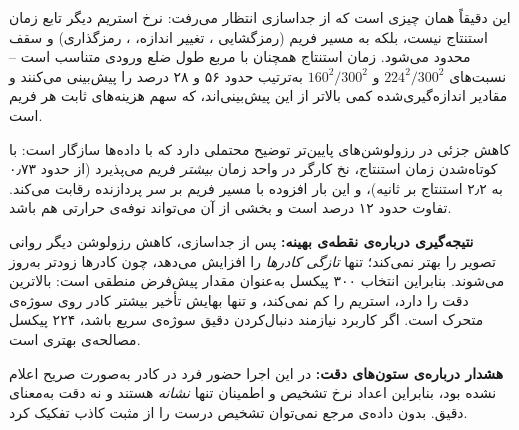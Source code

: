 این دقیقاً همان چیزی است که از جداسازی انتظار می‌رفت: نرخ استریم دیگر تابع زمان استنتاج نیست، بلکه به مسیر فریم (رمزگشایی ، تغییر اندازه، ، رمزگذاری) و سقف  محدود می‌شود. زمان استنتاج همچنان با مربع طول ضلع ورودی متناسب است -- نسبت‌های $224^2/300^2$ و $160^2/300^2$ به‌ترتیب حدود ۵۶ و ۲۸ درصد را پیش‌بینی می‌کنند و مقادیر اندازه‌گیری‌شده کمی بالاتر از این پیش‌بینی‌اند، که سهم هزینه‌های ثابت هر فریم است.

کاهش جزئی  در رزولوشن‌های پایین‌تر توضیح محتملی دارد که با داده‌ها سازگار است: با کوتاه‌شدن زمان استنتاج، نخ کارگر در واحد زمان \emph{بیشتر} فریم می‌پذیرد (از حدود ۰٫۷۳ به ۲٫۲ استنتاج بر ثانیه)، و این بار افزوده با مسیر فریم بر سر پردازنده رقابت می‌کند. تفاوت حدود ۱۲ درصد است و بخشی از آن می‌تواند نوفه‌ی حرارتی هم باشد.

\textbf{نتیجه‌گیری درباره‌ی نقطه‌ی بهینه:} پس از جداسازی، کاهش رزولوشن دیگر روانی تصویر را بهتر نمی‌کند؛ تنها \emph{تازگی کادرها} را افزایش می‌دهد، چون کادرها زودتر به‌روز می‌شوند. بنابراین انتخاب ۳۰۰ پیکسل به‌عنوان مقدار پیش‌فرض منطقی است: بالاترین دقت را دارد،  استریم را کم نمی‌کند، و تنها بهایش تأخیر بیشتر کادر روی سوژه‌ی متحرک است. اگر کاربرد نیازمند دنبال‌کردن دقیق سوژه‌ی سریع باشد، ۲۲۴ پیکسل مصالحه‌ی بهتری است.

\textbf{هشدار درباره‌ی ستون‌های دقت:} در این اجرا حضور فرد در کادر به‌صورت صریح اعلام نشده بود، بنابراین اعداد نرخ تشخیص و اطمینان تنها \emph{نشانه} هستند و نه دقت به‌معنای دقیق. بدون داده‌ی مرجع نمی‌توان تشخیص درست را از مثبت کاذب تفکیک کرد.
